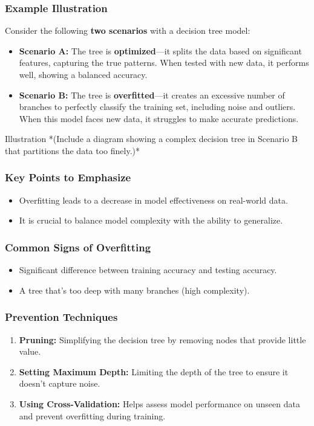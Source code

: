 \documentclass[aspectratio=169]{beamer}
\begin{document}
\begin{frame}[fragile]
  \frametitle{Example Illustration}
  Consider the following \textbf{two scenarios} with a decision tree model:
  \begin{itemize}
    \item \textbf{Scenario A:} The tree is \textbf{optimized}—it splits the data based on significant features, capturing the true patterns. When tested with new data, it performs well, showing a balanced accuracy.
    \item \textbf{Scenario B:} The tree is \textbf{overfitted}—it creates an excessive number of branches to perfectly classify the training set, including noise and outliers. When this model faces new data, it struggles to make accurate predictions.
  \end{itemize}
  \begin{block}{Illustration}
    *(Include a diagram showing a complex decision tree in Scenario B that partitions the data too finely.)*
  \end{block}
\end{frame}

\begin{frame}[fragile]
  \frametitle{Key Points to Emphasize}
  \begin{itemize}
    \item Overfitting leads to a decrease in model effectiveness on real-world data.
    \item It is crucial to balance model complexity with the ability to generalize.
  \end{itemize}
\end{frame}

\begin{frame}[fragile]
  \frametitle{Common Signs of Overfitting}
  \begin{itemize}
    \item Significant difference between training accuracy and testing accuracy.
    \item A tree that's too deep with many branches (high complexity).
  \end{itemize}
\end{frame}

\begin{frame}[fragile]
  \frametitle{Prevention Techniques}
  \begin{enumerate}
    \item \textbf{Pruning:} Simplifying the decision tree by removing nodes that provide little value.
    \item \textbf{Setting Maximum Depth:} Limiting the depth of the tree to ensure it doesn’t capture noise.
    \item \textbf{Using Cross-Validation:} Helps assess model performance on unseen data and prevent overfitting during training.
  \end{enumerate}
\end{frame}
\end{document}
